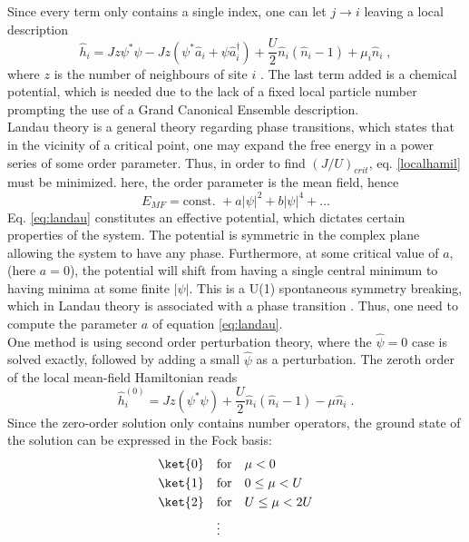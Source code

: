Since every term only contains a single index, one can let $j \rightarrow i$ leaving a local description
\begin{equation}
	\hat{h}_i = J z \psi^* \psi - J z \left( \psi^* \hat{a}_i + \psi \hat{a}_{i}^{\dag} \right) + \frac{U}{2} \hat{n}_i \left( \hat{n}_i -1 \right) + \mu_i \hat{n}_i \; ,
	\label{localhamil}
\end{equation}
where $z$ is the number of neighbours of site $i$ \cite{vanoosten}. The last term added is a chemical potential, which is needed due to the lack of a fixed local particle number prompting the use of a Grand Canonical Ensemble description.\\
Landau theory is a general theory regarding phase transitions, which states that in the vicinity of a critical point, one may expand the free energy in a power series of some order parameter. Thus, in order to find $(J/U)_{crit}$, eq. \eqref{localhamil} must be minimized. here, the order parameter is the mean field, hence
\begin{equation}
	E_{MF} = \text{const. } + a |\psi|^2 + b |\psi|^4 + \ldots \label{eq:landau}
\end{equation} 
Eq. \eqref{eq:landau} constitutes an effective potential, which dictates certain properties of the system.
The potential is symmetric in the complex plane allowing the system to have any phase. Furthermore, at some critical value of $a$, (here $a = 0$), the potential will shift from having a single central minimum to having minima at some finite $|\psi|$. This is a U(1) spontaneous symmetry breaking, which in Landau theory is associated with a phase transition \cite{plischke}. Thus, one need to compute the parameter $a$ of equation \eqref{eq:landau}.\\
One method is using second order perturbation theory, where the $\hat{\psi} = 0$ case is solved exactly, followed by adding a small $\hat{\psi}$ as a perturbation. The zeroth order of the local mean-field Hamiltonian reads
\begin{equation}
	\hat{h}_{i}^{(0)} = J z \left( \psi^* \psi \right) + \frac{U}{2} \hat{n}_i \left( \hat{n}_i -1 \right) - \mu \hat{n}_i \; .
\end{equation} 
Since the zero-order solution only contains number operators, the ground state of the solution can be expressed in the Fock basis:
\begin{align*}
	\ket{0} \quad &\text{for} \quad \mu < 0 \\
	\ket{1} \quad &\text{for} \quad 0 \leq \mu < U \\
	\ket{2} \quad &\text{for} \quad U \leq \mu < 2 U \\
	& \vdots
\end{align*} 
